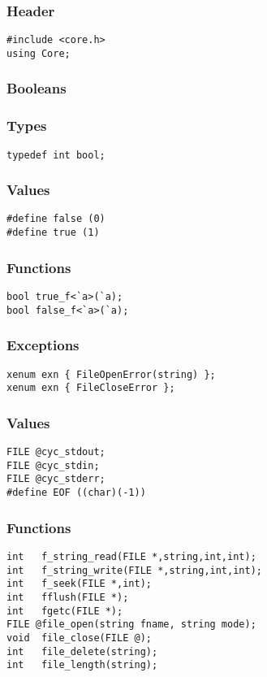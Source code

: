 \subsubsection*{Header}
\begin{verbatim}
#include <core.h>
using Core;
\end{verbatim}

\subsubsection*{Booleans}
\subsubsection*{Types}
\begin{verbatim}
typedef int bool;
\end{verbatim}

\subsubsection*{Values}
\begin{verbatim}
#define false (0)
#define true (1)
\end{verbatim}

\subsubsection*{Functions}
\begin{verbatim}
bool true_f<`a>(`a);
bool false_f<`a>(`a);
\end{verbatim}

\subsubsection*{Exceptions}
\begin{verbatim}
xenum exn { FileOpenError(string) };
xenum exn { FileCloseError };
\end{verbatim}

\subsubsection*{Values}
\begin{verbatim}
FILE @cyc_stdout;
FILE @cyc_stdin;
FILE @cyc_stderr;
#define EOF ((char)(-1))
\end{verbatim}

\subsubsection*{Functions}
\begin{verbatim}
int   f_string_read(FILE *,string,int,int);
int   f_string_write(FILE *,string,int,int);
int   f_seek(FILE *,int);
int   fflush(FILE *);
int   fgetc(FILE *);
FILE @file_open(string fname, string mode);
void  file_close(FILE @);
int   file_delete(string);
int   file_length(string);
\end{verbatim}

